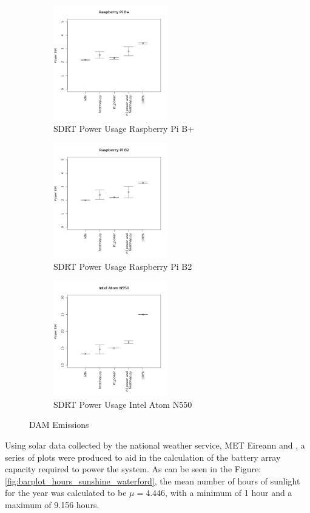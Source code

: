 \documentclass[runningheads,a4paper]{llncs}
\begin{document}
%
\begin{figure}	
	\centering
	\begin{subfigure}[t]{5cm}
		\centering
		\includegraphics[width=5cm]{images/59}
		\caption{SDRT Power Usage Raspberry Pi B+}\label{fig:sdrt_power_usage_pi_b}		
	\end{subfigure}
	\quad
	\begin{subfigure}[t]{5cm}
		\centering
		\includegraphics[width=5cm]{images/60}
		\caption{SDRT Power Usage Raspberry Pi B2}\label{fig:sdrt_power_usage_pi_b2}
	\end{subfigure}
	\quad
	\begin{subfigure}[t]{5cm}
		\centering
		\includegraphics[width=5cm]{images/61}
		\caption{SDRT Power Usage Intel Atom N550}\label{fig:sdrt_power_usage_atom_n55}
	\end{subfigure}
	\caption{DAM Emissions}\label{fig:jupiter_dam}
\end{figure}
%


\newpage
Using solar data collected by the national weather service, MET Eireann \citep{MET-15} and \citep{ECAD-15}, a series of plots were produced to aid in the calculation of the battery array capacity required to power the system. As can be seen in the Figure: \ref{fig:barplot_hours_sunshine_waterford}, the mean number of hours of sunlight for the year was calculated to be $\mu = 4.446$, with a minimum of 1 hour and a maximum of 9.156 hours.
\end{document}
